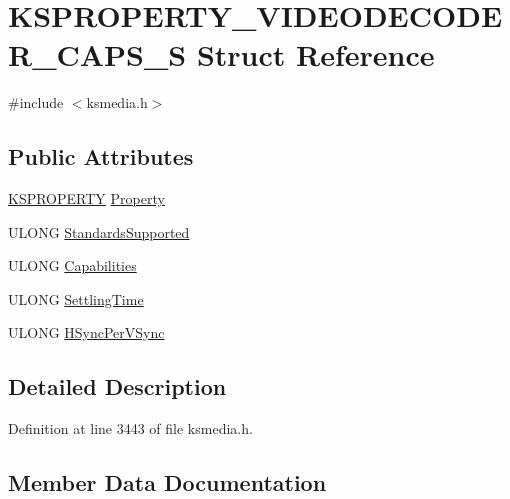 \hypertarget{struct_k_s_p_r_o_p_e_r_t_y___v_i_d_e_o_d_e_c_o_d_e_r___c_a_p_s___s}{}\section{K\+S\+P\+R\+O\+P\+E\+R\+T\+Y\+\_\+\+V\+I\+D\+E\+O\+D\+E\+C\+O\+D\+E\+R\+\_\+\+C\+A\+P\+S\+\_\+S Struct Reference}
\label{struct_k_s_p_r_o_p_e_r_t_y___v_i_d_e_o_d_e_c_o_d_e_r___c_a_p_s___s}


{\ttfamily \#include $<$ksmedia.\+h$>$}

\subsection*{Public Attributes}
\begin{DoxyCompactItemize}
\item 
\hyperlink{ks_8h_a4392f77c74e868d813d46c39ada4d660}{K\+S\+P\+R\+O\+P\+E\+R\+TY} \hyperlink{struct_k_s_p_r_o_p_e_r_t_y___v_i_d_e_o_d_e_c_o_d_e_r___c_a_p_s___s_a31042ea9e7a4d26a2ffbf7e35300c18d}{Property}
\item 
U\+L\+O\+NG \hyperlink{struct_k_s_p_r_o_p_e_r_t_y___v_i_d_e_o_d_e_c_o_d_e_r___c_a_p_s___s_adb8dbde42c2d8a12f3ae9ec6da805850}{Standards\+Supported}
\item 
U\+L\+O\+NG \hyperlink{struct_k_s_p_r_o_p_e_r_t_y___v_i_d_e_o_d_e_c_o_d_e_r___c_a_p_s___s_ab6966b029cf52556894f59410a0089df}{Capabilities}
\item 
U\+L\+O\+NG \hyperlink{struct_k_s_p_r_o_p_e_r_t_y___v_i_d_e_o_d_e_c_o_d_e_r___c_a_p_s___s_a311e426096c691141ac95dcb75d74bd4}{Settling\+Time}
\item 
U\+L\+O\+NG \hyperlink{struct_k_s_p_r_o_p_e_r_t_y___v_i_d_e_o_d_e_c_o_d_e_r___c_a_p_s___s_a53c447d0788c2185b12cf09c8b3a6fea}{H\+Sync\+Per\+V\+Sync}
\end{DoxyCompactItemize}


\subsection{Detailed Description}


Definition at line 3443 of file ksmedia.\+h.



\subsection{Member Data Documentation}
